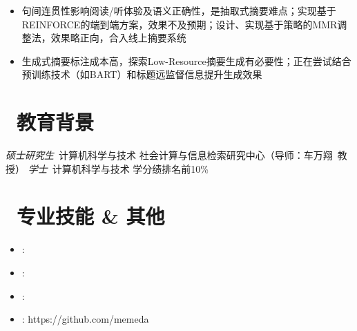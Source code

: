 \documentclass{resume}
\begin{document}
\begin{onehalfspacing} 
\begin{itemize}
  \item 句间连贯性影响阅读/听体验及语义正确性，是抽取式摘要难点；实现基于REINFORCE的端到端方案，效果不及预期；设计、实现基于策略的MMR调整法，效果略正向，合入线上摘要系统
  \item 生成式摘要标注成本高，探索Low-Resource摘要生成有必要性；正在尝试结合预训练技术（如BART）和标题远监督信息提升生成效果
\end{itemize}
\end{onehalfspacing}

\section{\faGraduationCap\ 教育背景}
\textit{硕士研究生}\ 计算机科学与技术 \hfill 社会计算与信息检索研究中心（导师：车万翔\ 教授）
\textit{学士}\ 计算机科学与技术 \hfill 学分绩排名前10\%


\section{\faCogs\ 专业技能 \& 其他}
\begin{itemize}
  \item {}:  
  \item {}:  
  \item {}:  
  \item {}: https://github.com/memeda
\end{itemize}  
  

%
%
\end{document}
